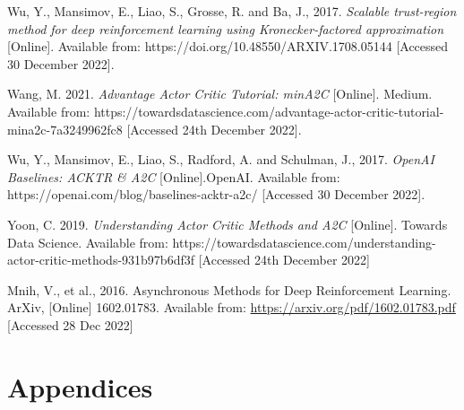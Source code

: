\documentclass{article}
\begin{document}
Wu, Y., Mansimov, E., Liao, S., Grosse, R. and Ba, J., 2017. \emph{Scalable trust-region method for deep reinforcement learning using Kronecker-factored approximation} [Online]. Available from: https://doi.org/10.48550/ARXIV.1708.05144 [Accessed 30 December 2022].

Wang, M. 2021. \emph{Advantage Actor Critic Tutorial: minA2C} [Online]. Medium. Available from: https://towardsdatascience.com/advantage-actor-critic-tutorial-mina2c-7a3249962fc8 [Accessed 24th December 2022].

Wu, Y., Mansimov, E., Liao, S., Radford, A. and Schulman, J., 2017. \emph{OpenAI Baselines: ACKTR \& A2C} [Online].OpenAI. Available from: https://openai.com/blog/baselines-acktr-a2c/ [Accessed 30 December 2022].

Yoon, C. 2019. \emph{Understanding Actor Critic Methods and A2C} [Online]. Towards Data Science. Available from: https://towardsdatascience.com/understanding-actor-critic-methods-931b97b6df3f [Accessed 24th December 2022]


\small

Mnih, V., et al., 2016. Asynchronous Methods for Deep Reinforcement Learning. ArXiv, [Online] 1602.01783.
Available from: \url{https://arxiv.org/pdf/1602.01783.pdf} [Accessed 28 Dec 2022]

\normalsize
\newpage
\section*{Appendices}
\end{document}
